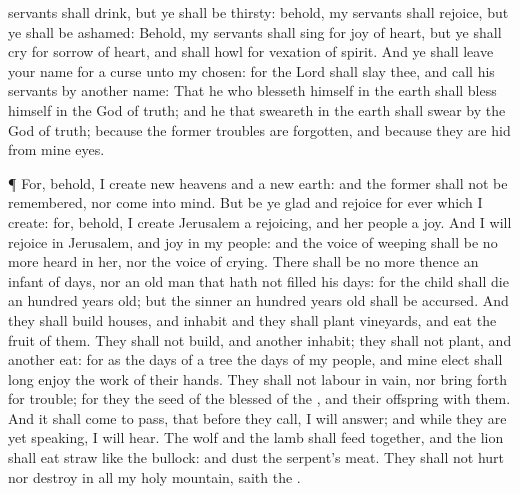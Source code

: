 {servants shall
drink, but ye shall be
thirsty: behold, my
servants shall
rejoice, but ye shall be
ashamed:
Behold, my
servants shall
sing for
joy of
heart, but ye shall
cry for
sorrow of
heart, and shall
howl for
vexation of
spirit.
And ye shall
leave your
name for a
curse unto my
chosen: for the
Lord
{} shall
slay thee, and
call his
servants by
another
name:
That he who
blesseth himself in the
earth shall
bless himself in the
God of
truth; and he that
sweareth in the
earth shall
swear by the
God of
truth; because the
former
troubles are
forgotten, and because they are
hid from mine
eyes.
\par }{\PP {}¶ For, behold, I
create
new
heavens and a
new
earth: and the
former shall not be
remembered, nor
come into
mind.
But be ye
glad and
rejoice for
ever
{} which I
create: for, behold, I
create
Jerusalem a
rejoicing, and her
people a
joy.
And I will
rejoice in
Jerusalem, and
joy in my
people: and the
voice of
weeping shall be no more
heard in her, nor the
voice of
crying.
There shall be no more thence an
infant of
days, nor an old
man that hath not
filled his
days: for the
child shall
die an
hundred
years
old; but the
sinner
{} an
hundred
years
old shall be
accursed.
And they shall
build
houses, and
inhabit
{} and they shall
plant
vineyards, and
eat the
fruit of them.
They shall not
build, and
another
inhabit; they shall not
plant, and
another
eat: for as the
days of a
tree
{} the
days of my
people, and mine
elect shall long
enjoy the
work of their
hands.
They shall not
labour in
vain, nor bring
forth for
trouble; for they
{} the
seed of the
blessed of the
{}, and their
offspring with them.
And it shall come to pass, that before they
call, I will
answer; and while they are yet
speaking, I will
hear.
The
wolf and the
lamb shall
feed
together, and the
lion shall
eat
straw like the
bullock: and
dust
{} the
serpent’s
meat. They shall not
hurt nor
destroy in all my
holy
mountain,
saith the
{}.

}
